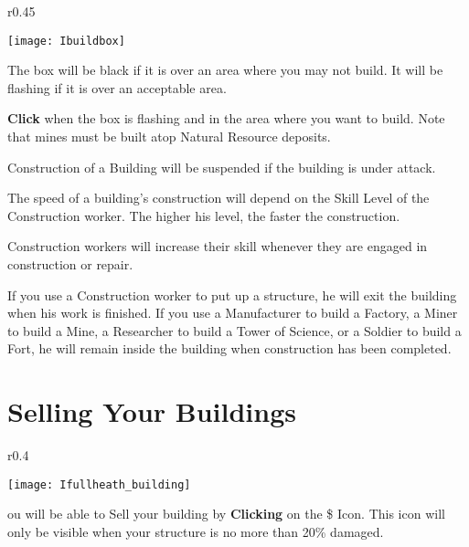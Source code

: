 \begin{wrapfigure}{r}{0.45\textwidth}
    \vspace{-20pt}
    \begin{center}
        \texttt{[image: Ibuildbox]} %
    \end{center}
    \vspace{-20pt}
\end{wrapfigure}

The box will be black if it is over an area where you may not build. It will be flashing if it is over an acceptable area.

\textbf{Click} when the box is flashing and in the area where you want to build. Note that mines must be built atop Natural Resource deposits. 

Construction of a Building will be suspended if the building is under attack.

The speed of a building’s construction will depend on the Skill Level of the Construction worker. The higher his level, the faster the construction.

Construction workers will increase their skill whenever they are engaged in construction or repair.

If you use a Construction worker to put up a structure, he will exit the building when his work is finished. If you use a Manufacturer to build a Factory, a Miner to build a Mine, a Researcher to build a Tower of Science, or a Soldier to build a Fort, he will remain inside the building when construction has been completed.

\section{\textsf{Selling Your Buildings}}


\begin{wrapfigure}{r}{0.4\textwidth}
    \vspace{-20pt}
    \begin{center}
        \texttt{[image: Ifullheath\_building]}
    \end{center}
    \vspace{-20pt}
\end{wrapfigure}

ou will be able to Sell your building by \textbf{Clicking} on the \$ Icon. This icon will only be visible when your structure is no more than 20\% damaged.

